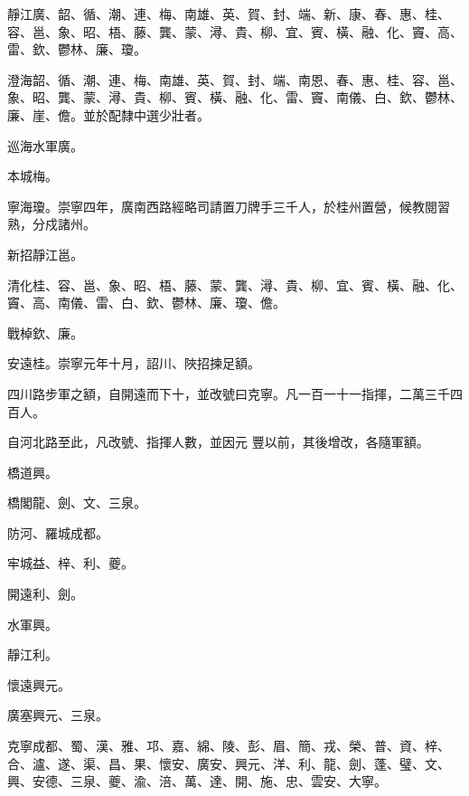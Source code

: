 \begin{pinyinscope}
 靜江廣、韶、循、潮、連、梅、南雄、英、賀、封、端、新、康、春、惠、桂、容、邕、象、昭、梧、藤、龔、蒙、潯、貴、柳、宜、賓、橫、融、化、竇、高、雷、欽、鬱林、廉、瓊。



 澄海韶、循、潮、連、梅、南雄、英、賀、封、端、南恩、春、惠、桂、容、邕、象、昭、龔、蒙、潯、貴、柳、賓、橫、融、化、雷、竇、南儀、白、欽、鬱林、廉、崖、儋。並於配隸中選少壯者。



 巡海水軍廣。



 本城梅。



 寧海瓊。崇寧四年，廣南西路經略司請置刀牌手三千人，於桂州置營，候教閱習熟，分戍諸州。



 新招靜江邕。



 清化桂、容、邕、象、昭、梧、藤、蒙、龔、潯、貴、柳、宜、賓、橫、融、化、竇、高、南儀、雷、白、欽、鬱林、廉、瓊、儋。



 戰棹欽、廉。



 安遠桂。崇寧元年十月，詔川、陜招揀足額。



 四川路步軍之額，自開遠而下十，並改號曰克寧。凡一百一十一指揮，二萬三千四百人。



 自河北路至此，凡改號、指揮人數，並因元
 豐以前，其後增改，各隨軍額。



 橋道興。



 橋閣龍、劍、文、三泉。



 防河、羅城成都。



 牢城益、梓、利、夔。



 開遠利、劍。



 水軍興。



 靜江利。



 懷遠興元。



 廣塞興元、三泉。



 克寧成都、蜀、漢、雅、邛、嘉、綿、陵、彭、眉、簡、戎、榮、普、資、梓、合、瀘、遂、渠、昌、果、懷安、廣安、興元、洋、利、龍、劍、蓬、璧、文、興、安德、三泉、夔、渝、涪、萬、達、開、施、忠、雲安、大寧。




\end{pinyinscope}

